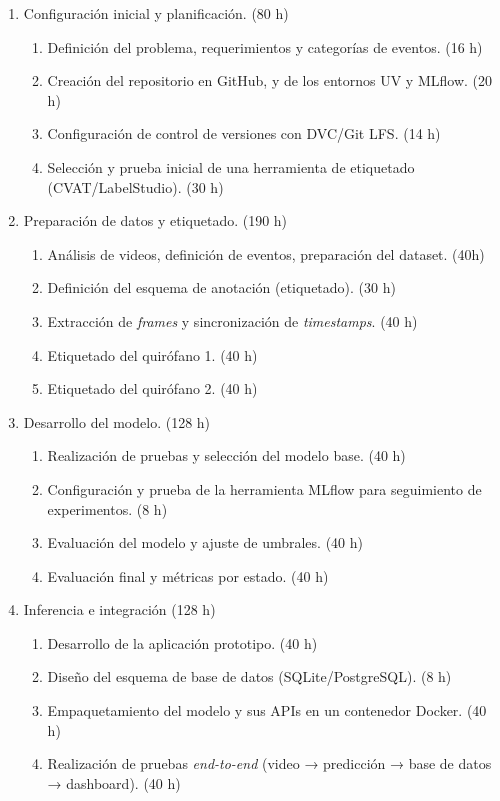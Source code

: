 \documentclass[
11pt, %
]{charter}
\begin{document}
\begin{enumerate}
	\item Configuración inicial y planificación. (80 h)
	\begin{enumerate}
		\item Definición del problema, requerimientos y categorías de eventos. (16 h)
		\item Creación del repositorio en GitHub, y de los entornos UV y MLflow.  (20 h)
		\item Configuración de control de versiones con DVC/Git LFS. (14 h)
		\item Selección y prueba inicial de una herramienta de etiquetado (CVAT/LabelStudio). (30 h)
	\end{enumerate}
	
	\item Preparación de datos y etiquetado. (190 h)
	\begin{enumerate}
		\item Análisis de videos, definición de eventos, preparación del dataset. (40h)
		\item Definición del esquema de anotación (etiquetado). (30 h)
		\item Extracción de \textit{frames} y sincronización de \textit{timestamps}. (40 h)
		\item Etiquetado del quirófano 1. (40 h)
		\item Etiquetado del quirófano 2.  (40 h)

	\end{enumerate}
	
	\item Desarrollo del modelo. (128 h)
	\begin{enumerate}
		\item Realización de pruebas y selección del modelo base. (40 h)
		\item Configuración y prueba de la herramienta MLflow para seguimiento de experimentos. (8 h)
		\item Evaluación del modelo y ajuste de umbrales. (40 h)
		\item Evaluación final y métricas por estado. (40 h)
	\end{enumerate}
	
	\item Inferencia e integración (128 h)
	\begin{enumerate}
		\item Desarrollo de la aplicación prototipo. (40 h)
		\item Diseño del esquema de base de datos (SQLite/PostgreSQL). (8 h)
		\item Empaquetamiento del modelo y sus APIs en un contenedor Docker. (40 h)
		\item Realización de pruebas\textit{ end-to-end }(video → predicción → base de datos → dashboard). (40 h)
	\end{enumerate}
	

\end{enumerate}
\end{document}
